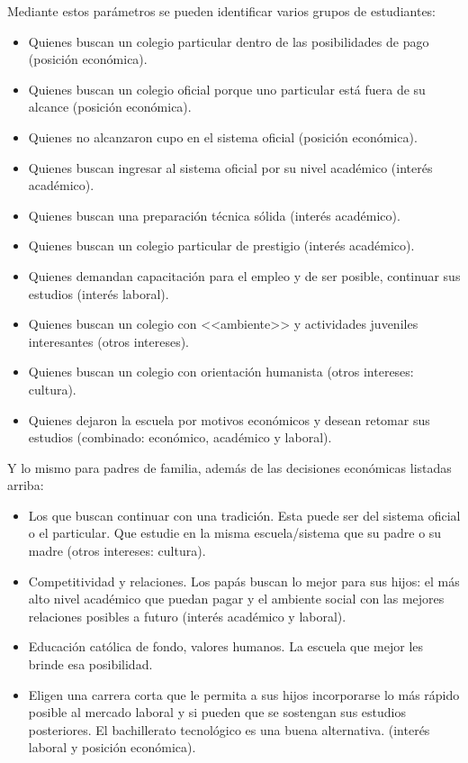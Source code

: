 Mediante estos parámetros se pueden identificar varios grupos de estudiantes:

\begin{itemize}
	\item Quienes buscan un colegio particular dentro de las posibilidades de pago (posición económica).
	\item Quienes buscan un colegio oficial porque uno particular está fuera de su alcance (posición económica).
	\item Quienes no alcanzaron cupo en el sistema oficial (posición económica).
	\item Quienes buscan ingresar al sistema oficial por su nivel académico (interés académico).
	\item Quienes buscan una preparación técnica sólida (interés académico).
	\item Quienes buscan un colegio particular de prestigio (interés académico).
	\item Quienes demandan capacitación para el empleo y de ser posible, continuar sus estudios (interés laboral).
	\item Quienes buscan un colegio con <<ambiente>> y actividades juveniles interesantes (otros intereses).
	\item Quienes buscan un colegio con orientación humanista (otros intereses: cultura).
	\item Quienes dejaron la escuela por motivos económicos y desean retomar sus estudios (combinado: económico, académico y laboral).
\end{itemize}

Y lo mismo para padres de familia, además de las decisiones económicas listadas arriba:

\begin{itemize}
	\item Los que buscan continuar con una tradición. Esta puede ser del sistema oficial o el particular. Que estudie en la misma escuela/sistema que su padre o su madre (otros intereses: cultura).
	\item Competitividad y relaciones. Los papás buscan lo mejor para sus hijos: el más alto nivel académico que puedan pagar y el ambiente social con las mejores relaciones posibles a futuro (interés académico y laboral).
	\item Educación católica de fondo, valores humanos. La escuela que mejor les brinde esa posibilidad.
	\item Eligen una carrera corta que le permita a sus hijos incorporarse lo más rápido posible al mercado laboral y si pueden que se sostengan sus estudios posteriores. El bachillerato tecnológico es una buena alternativa. (interés laboral y posición económica).
\end{itemize}

